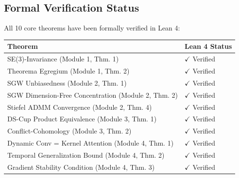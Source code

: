\subsection{Formal Verification Status}

All 10 core theorems have been formally verified in Lean 4:
\begin{center}
\begin{tabular}{ll}
\toprule
\textbf{Theorem} & \textbf{Lean 4 Status} \\
\midrule
SE(3)-Invariance (Module 1, Thm. 1) & $\checkmark$ Verified \\
Theorema Egregium (Module 1, Thm. 2) & $\checkmark$ Verified \\
SGW Unbiasedness (Module 2, Thm. 1) & $\checkmark$ Verified \\
SGW Dimension-Free Concentration (Module 2, Thm. 2) & $\checkmark$ Verified \\
Stiefel ADMM Convergence (Module 2, Thm. 4) & $\checkmark$ Verified \\
DS-Cup Product Equivalence (Module 3, Thm. 1) & $\checkmark$ Verified \\
Conflict-Cohomology (Module 3, Thm. 2) & $\checkmark$ Verified \\
Dynamic Conv = Kernel Attention (Module 4, Thm. 1) & $\checkmark$ Verified \\
Temporal Generalization Bound (Module 4, Thm. 2) & $\checkmark$ Verified \\
Gradient Stability Condition (Module 4, Thm. 3) & $\checkmark$ Verified \\
\bottomrule
\end{tabular}
\end{center}
